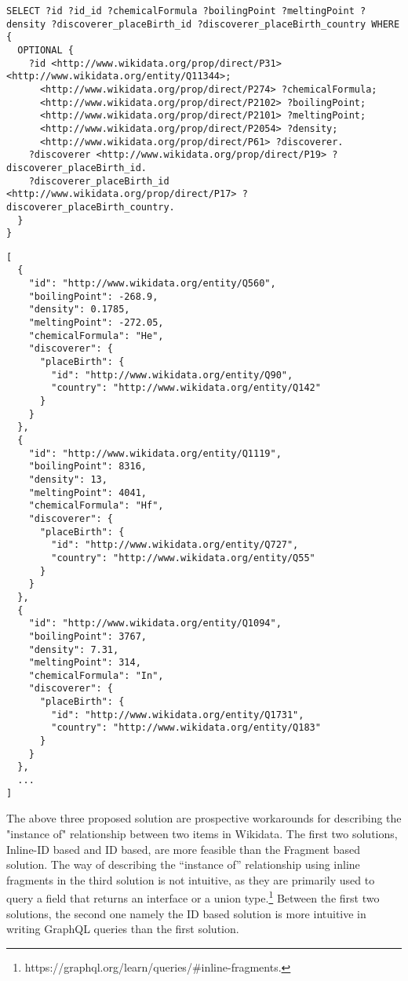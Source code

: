 \begin{minipage}{\linewidth}
\begin{lstlisting}[label=listing:listing27, caption={Generated SPARQL Query}]
SELECT ?id ?id_id ?chemicalFormula ?boilingPoint ?meltingPoint ?density ?discoverer_placeBirth_id ?discoverer_placeBirth_country WHERE {
  OPTIONAL {
    ?id <http://www.wikidata.org/prop/direct/P31> <http://www.wikidata.org/entity/Q11344>;
      <http://www.wikidata.org/prop/direct/P274> ?chemicalFormula;
      <http://www.wikidata.org/prop/direct/P2102> ?boilingPoint;
      <http://www.wikidata.org/prop/direct/P2101> ?meltingPoint;
      <http://www.wikidata.org/prop/direct/P2054> ?density;
      <http://www.wikidata.org/prop/direct/P61> ?discoverer.
    ?discoverer <http://www.wikidata.org/prop/direct/P19> ?discoverer_placeBirth_id.
    ?discoverer_placeBirth_id <http://www.wikidata.org/prop/direct/P17> ?discoverer_placeBirth_country.
  }
}
\end{lstlisting}
\end{minipage}

\begin{minipage}{\linewidth}
\begin{lstlisting}[label=listing:listing28, caption={Output}]
[
  {
    "id": "http://www.wikidata.org/entity/Q560",        
    "boilingPoint": -268.9,
    "density": 0.1785,
    "meltingPoint": -272.05,
    "chemicalFormula": "He",
    "discoverer": {
      "placeBirth": {
        "id": "http://www.wikidata.org/entity/Q90",     
        "country": "http://www.wikidata.org/entity/Q142"
      }
    }
  },
  {
    "id": "http://www.wikidata.org/entity/Q1119",       
    "boilingPoint": 8316,
    "density": 13,
    "meltingPoint": 4041,
    "chemicalFormula": "Hf",
    "discoverer": {
      "placeBirth": {
        "id": "http://www.wikidata.org/entity/Q727",
        "country": "http://www.wikidata.org/entity/Q55"
      }
    }
  },
  {
    "id": "http://www.wikidata.org/entity/Q1094",
    "boilingPoint": 3767,
    "density": 7.31,
    "meltingPoint": 314,
    "chemicalFormula": "In",
    "discoverer": {
      "placeBirth": {
        "id": "http://www.wikidata.org/entity/Q1731",
        "country": "http://www.wikidata.org/entity/Q183"
      }
    }
  },
  ...
]
\end{lstlisting}
\end{minipage}

The above three proposed solution are prospective workarounds for describing the "instance of" relationship between two items in Wikidata. The first two solutions, Inline-ID based and ID based, are more feasible than the Fragment based solution. The way of describing the “instance of” relationship using inline fragments in the third solution  is not intuitive, as they are primarily used to query a field that returns an interface or a union type.\footnote{https://graphql.org/learn/queries/\#inline-fragments.} Between the first two solutions, the second one namely the ID based solution is more intuitive in writing GraphQL queries than the first solution.

